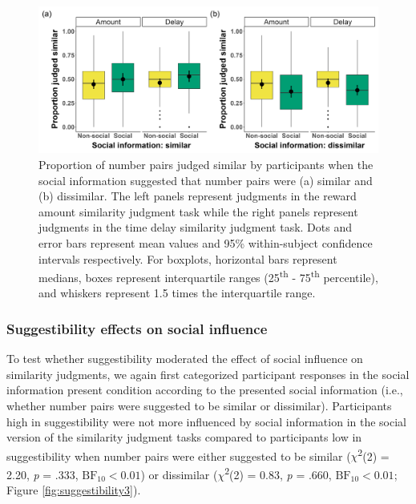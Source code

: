 \documentclass[
  pub,floatsintext]{apa6}
\begin{document}
\begin{figure}
\includegraphics[width=1\linewidth]{figures/judgments_socialinfo_combined_3} \caption{Proportion of number pairs judged similar by participants when the social information suggested that number pairs were (a) similar and (b) dissimilar. The left panels represent judgments in the reward amount similarity judgment task while the right panels represent judgments in the time delay similarity judgment task. Dots and error bars represent mean values and 95\% within-subject confidence intervals respectively. For boxplots, horizontal bars represent medians, boxes represent interquartile ranges (25\textsuperscript{th} - 75\textsuperscript{th} percentile), and whiskers represent 1.5 times the interquartile range.}\label{fig:judgmentssocialinfo3}
\end{figure}

\hypertarget{suggestibility-effects-on-social-influence-2}{%
\subsubsection{Suggestibility effects on social influence}\label{suggestibility-effects-on-social-influence-2}}

To test whether suggestibility moderated the effect of social influence on similarity judgments, we again first categorized participant responses in the social information present condition according to the presented social information (i.e., whether number pairs were suggested to be similar or dissimilar). Participants high in suggestibility were not more influenced by social information in the social version of the similarity judgment tasks compared to participants low in suggestibility when number pairs were either suggested to be similar (\(\chi\)\textsuperscript{2}(2) = 2.20, \emph{p} = .333, \(\mathrm{BF}_{\textrm{10}} < 0.01\)) or dissimilar (\(\chi\)\textsuperscript{2}(2) = 0.83, \emph{p} = .660, \(\mathrm{BF}_{\textrm{10}} < 0.01\); Figure \ref{fig:suggestibility3}).
\end{document}
